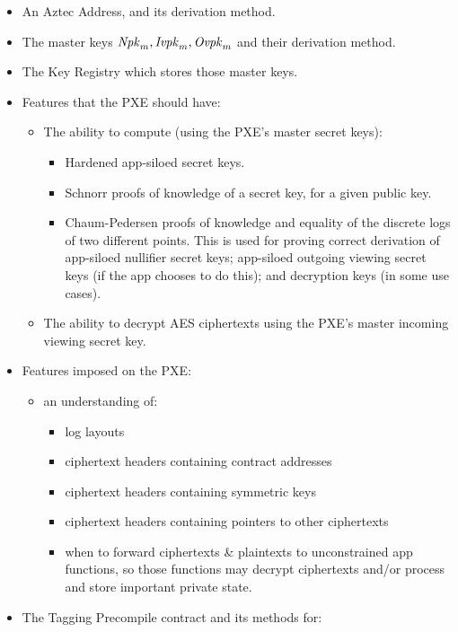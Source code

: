 \begin{itemize}
    \item An Aztec Address, and its derivation method.
    \item The master keys $\Npkm, \Ivpkm, \Ovpkm$ and their derivation method.
    \item The Key Registry which stores those master keys.\\
    \item Features that the PXE should have:
    \begin{itemize}
        \item The ability to compute (using the PXE's master secret keys):
        \begin{itemize}
            \item Hardened app-siloed secret keys.
            \item Schnorr proofs of knowledge of a secret key, for a given public key.
            \item Chaum-Pedersen proofs of knowledge and equality of the discrete logs of two different points. This is used for proving correct derivation of app-siloed nullifier secret keys; app-siloed outgoing viewing secret keys (if the app chooses to do this); and decryption keys (in some use cases).
        \end{itemize}
        \item The ability to decrypt AES ciphertexts using the PXE's master incoming viewing secret key.
    \end{itemize}
    \item Features imposed on the PXE:
    \begin{itemize}
        \item an understanding of:
        \begin{itemize}
            \item log layouts
            \item ciphertext headers containing contract addresses
            \item ciphertext headers containing symmetric keys
            \item ciphertext headers containing pointers to other ciphertexts 
            \item when to forward ciphertexts \& plaintexts to unconstrained app functions, so those functions may decrypt ciphertexts and/or process and store important private state.
        \end{itemize}
    \end{itemize}
    \item The Tagging Precompile contract and its methods for:

\end{itemize}
